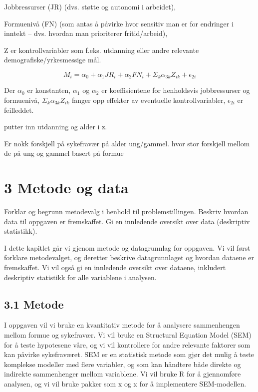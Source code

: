 \documentclass[
  12pt,
  a4paper,
  DIV=11,
  numbers=noendperiod]{scrartcl}
\begin{document}
Jobbressurser (JR) (dvs. støtte og autonomi i arbeidet),

Formuenivå (FN) (som antas å påvirke hvor sensitiv man er for endringer
i inntekt -- dvs. hvordan man prioriterer fritid/arbeid),

Z er kontrollvariabler som f.eks. utdanning eller andre relevante
demografiske/yrkesmessige mål.

\[
M_i = \alpha_0 + \alpha_1 JR_i + \alpha_2 FN_i + \Sigma_k \alpha_{3k}Z_{ik} + \epsilon_{2i}
\]

Der \(\alpha_0\) er konstanten, \(\alpha_1\) og \(\alpha_2\) er
koeffisientene for henholdsvis jobbressurser og formuenivå,
\(\Sigma_k \alpha_{3k}Z_{ik}\) fanger opp effekter av eventuelle
kontrollvariabler, \(\epsilon_{2i}\) er feilleddet.

putter inn utdanning og alder i z.

Er nokk forskjell på sykefravær på alder ung/gammel. hvor stor forskjell
mellom de på ung og gammel basert på formue

\newpage

\section{3 Metode og data}\label{metode-og-data}

Forklar og begrunn metodevalg i henhold til problemstillingen. Beskriv
hvordan data til oppgaven er fremskaffet. Gi en innledende oversikt over
data (deskriptiv statistikk).

I dette kapitlet går vi gjenom metode og datagrunnlag for oppgaven. Vi
vil først forklare metodevalget, og deretter beskrive datagrunnlaget og
hvordan dataene er fremskaffet. Vi vil også gi en innledende oversikt
over dataene, inkludert deskriptiv statistikk for alle variablene i
analysen.

\subsection{3.1 Metode}\label{metode}

I oppgaven vil vi bruke en kvantitativ metode for å analysere
sammenhengen mellom formue og sykefravær. Vi vil bruke en Structural
Equation Model (SEM) for å teste hypotesene våre, og vi vil kontrollere
for andre relevante faktorer som kan påvirke sykefraværet. SEM er en
statistisk metode som gjør det mulig å teste komplekse modeller med
flere variabler, og som kan håndtere både direkte og indirekte
sammenhenger mellom variablene. Vi vil bruke R for å gjennomføre
analysen, og vi vil bruke pakker som x og x for å implementere
SEM-modellen.
\end{document}
